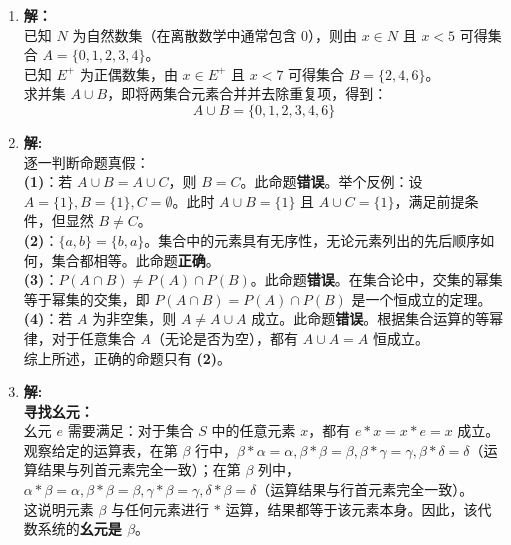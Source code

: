 \begin{enumerate}
	\vspace{1em}
	
	\item \textbf{解：}\\
	已知 $N$ 为自然数集（在离散数学中通常包含 $0$），则由 $x \in N$ 且 $x < 5$ 可得集合 $A = \{0, 1, 2, 3, 4\}$。\\
	已知 $E^+$ 为正偶数集，由 $x \in E^+$ 且 $x < 7$ 可得集合 $B = \{2, 4, 6\}$。\\
	求并集 $A \cup B$，即将两集合元素合并并去除重复项，得到：
	\[ A \cup B = \{0, 1, 2, 3, 4, 6\} \]
	
	\vspace{1em}
	
	\item \textbf{解:}\\
	逐一判断命题真假：\\
	\textbf{(1)}：若 $A \cup B = A \cup C$，则 $B = C$。此命题\textbf{错误}。举个反例：设 $A=\{1\}, B=\{1\}, C=\emptyset$。此时 $A \cup B = \{1\}$ 且 $A \cup C = \{1\}$，满足前提条件，但显然 $B \neq C$。\\
	\textbf{(2)}：$\{a, b\} = \{b, a\}$。集合中的元素具有无序性，无论元素列出的先后顺序如何，集合都相等。此命题\textbf{正确}。\\
	\textbf{(3)}：$P(A \cap B) \neq P(A) \cap P(B)$。此命题\textbf{错误}。在集合论中，交集的幂集等于幂集的交集，即 $P(A \cap B) = P(A) \cap P(B)$ 是一个恒成立的定理。\\
	\textbf{(4)}：若 $A$ 为非空集，则 $A \neq A \cup A$ 成立。此命题\textbf{错误}。根据集合运算的等幂律，对于任意集合 $A$（无论是否为空），都有 $A \cup A = A$ 恒成立。\\
	综上所述，正确的命题只有 \textbf{(2)}。
	
	\vspace{1em}
	
	\item \textbf{解:}\\
	\textbf{寻找幺元：}\\
	幺元 $e$ 需要满足：对于集合 $S$ 中的任意元素 $x$，都有 $e * x = x * e = x$ 成立。\\
	观察给定的运算表，在第 $\beta$ 行中，$\beta * \alpha = \alpha, \beta * \beta = \beta, \beta * \gamma = \gamma, \beta * \delta = \delta$（运算结果与列首元素完全一致）；在第 $\beta$ 列中，$\alpha * \beta = \alpha, \beta * \beta = \beta, \gamma * \beta = \gamma, \delta * \beta = \delta$（运算结果与行首元素完全一致）。\\
	这说明元素 $\beta$ 与任何元素进行 $*$ 运算，结果都等于该元素本身。因此，该代数系统的\textbf{幺元是 $\beta$}。
	

\end{enumerate}
